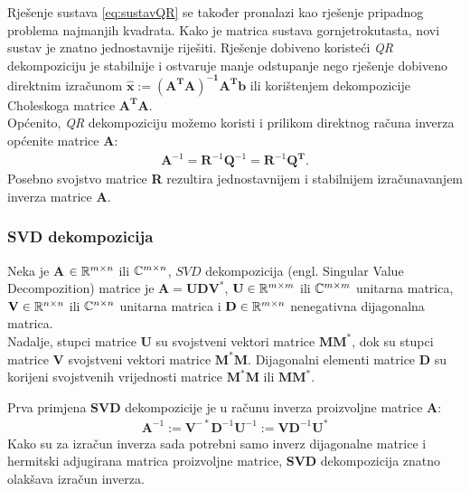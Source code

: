 \documentclass[a4paper,twoside,12pt]{memoir} %
\begin{document}
Rješenje sustava \eqref{eq:sustavQR} se također pronalazi kao rješenje pripadnog problema najmanjih kvadrata. Kako je matrica sustava
gornjetrokutasta, novi sustav je znatno jednostavnije riješiti.
Rješenje dobiveno koristeći \textit{QR} dekompoziciju je stabilnije i ostvaruje manje odstupanje nego rješenje dobiveno
direktnim izračunom $\mathbf{\hat{x}}:= \mathbf{(A^TA)^{-1}A^T}\mathbf{b}$ ili korištenjem dekompozicije Choleskoga matrice $\mathbf{A^TA}$.\\
Općenito, \textit{QR} dekompoziciju možemo koristi i prilikom direktnog računa 
inverza općenite matrice \textbf{A}:
\begin{align}
\mathbf{A}^{-1} = \mathbf{R}^{-1}\mathbf{Q}^{-1} = \mathbf{R}^{-1}\mathbf{Q^T}.
\end{align}
Posebno svojstvo matrice \textbf{R} rezultira jednostavnijem i stabilnijem izračunavanjem inverza matrice \textbf{A}.

\subsubsection{SVD dekompozicija}
\begin{defn}
	Neka je \textbf{A} $\in \mathbb{R}^{m\times n}$ ili $\mathbb{C}^{m \times n}$, $SVD$ dekompozicija (engl. Singular Value Decompozition) matrice je $\mathbf{A} = \mathbf{UDV}^*$, $\mathbf{U} \in \mathbb{R}^{m\times m}$ ili $\mathbb{C}^{m\times m}$ unitarna matrica, $\mathbf{V} \in \mathbb{R}^{n\times n}$ ili $\mathbb{C}^{n\times n}$ unitarna matrica i $\mathbf{D} \in \mathbb{R}^{m\times n}$ nenegativna dijagonalna matrica. \\
	Nadalje, stupci matrice \textbf{U} su svojstveni vektori matrice $\mathbf{MM}^*$, dok su stupci matrice \textbf{V} 
	svojstveni vektori matrice $\mathbf{M}^*\mathbf{M}$. Dijagonalni elementi matrice $\mathbf{D}$ su korijeni svojstvenih vrijednosti matrice $\mathbf{M}^*\mathbf{M}$ ili $\mathbf{MM}^*$.
\end{defn}%

Prva primjena \textbf{SVD} dekompozicije je u računu inverza proizvoljne matrice \textbf{A}:%
\begin{align}
\mathbf{A}^{-1} := \mathbf{V}^{-*}\mathbf{D}^{-1}\mathbf{U}^{-1} := \mathbf{V}\mathbf{D}^{-1}\mathbf{U}^*
\end{align}
Kako su za izračun inverza sada potrebni samo inverz dijagonalne matrice i hermitski adjugirana matrica proizvoljne matrice, \textbf{SVD} dekompozicija znatno olakšava izračun inverza.
 
\end{document}
